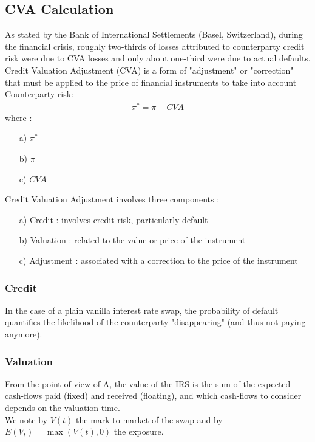\documentclass[11pt]{article}
\numberwithin{equation}{subsection}
\begin{document}
\subsection{CVA Calculation}
As stated by the Bank of International Settlements (Basel, Switzerland), during the financial crisis, roughly two-thirds of losses attributed to counterparty credit risk were due to CVA losses and only about one-third were due to actual defaults.
Credit Valuation Adjustment (CVA) is a form of "adjustment" or "correction" that must be applied to the price of financial instruments to take into account Counterparty risk:
\begin{eqnarray*}
	\pi^{*}=\pi - CVA
\end{eqnarray*}
where :
\begin{enumerate}
	\item [a)] \(\pi^{*}\) \ 
	\item [b)] \(\pi\)  \ 
	\item [c)] \(CVA\)  \ 
\end{enumerate}
Credit Valuation Adjustment involves three components :
\begin{enumerate}
	\item [a)] Credit : involves credit risk, particularly default
	\item [b)] Valuation : related to the value or price of the instrument
	\item [c)] Adjustment : associated with a correction to the price of the instrument
\end{enumerate}
\subsubsection{Credit}
In the case of a plain vanilla interest rate swap, the probability of default quantifies the likelihood of the counterparty "disappearing" (and thus not paying anymore).
\subsubsection{Valuation}
From the point of view of A, the value of the IRS is the sum of the expected cash-flows paid (fixed) and received
(floating), and which cash-flows to consider depends on the valuation time.\\
We note by \(V(t)\) the mark-to-market of the swap and by \(E(V_t) = \max(V(t), 0)\) the exposure.\\
\end{document}
